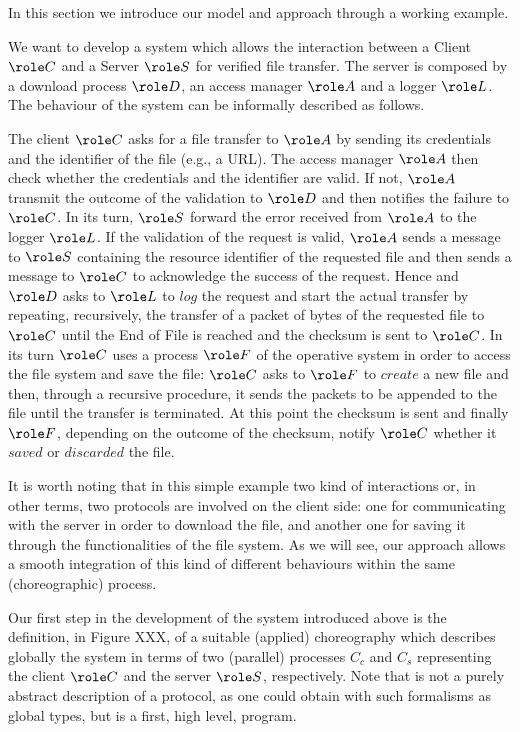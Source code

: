 

In this section we introduce our model and approach through a working example. 



We want to develop a system which allows the interaction between  a Client
$\role C$ and a Server $\role S$ for verified file transfer. The server is
composed by a download process $\role D$, an access manager  $\role A$ and a
logger $\role L$. The behaviour of the system can be informally described as
follows.

The client $\role C$ asks for a file transfer to $\role A$ by sending its
credentials and the identifier of the file (e.g., a URL). The access manager
$\role A$ then check whether the credentials and the  identifier are valid. If
not, $\role A$ transmit the outcome of the validation to $\role D$ and then
notifies the failure  to $\role C$. In its turn,  $\role S$ forward the error
received from $\role A$ to the logger $\role L$.
If the validation of the request is valid, $\role A$ sends a message to $\role
S$ containing the resource identifier of the requested file and then sends a
message to $\role C$  to acknowledge the success of the request. Hence  and
$\role D$ asks to $\role L$ to $log$ the request and start the actual transfer
by repeating, recursively, the transfer of  a packet of bytes of the requested
file to $\role C$ until the End of File is reached and  the checksum is sent to
$\role C$. In its turn $\role C$ uses a process  $\role F$ of the operative
system in order to access the file system and save the file: $\role C$ asks to
$\role F$ to $create$ a new file and then, through a recursive procedure, it
sends the packets to be appended to the file until the transfer is terminated.
At this point  the checksum is sent and finally  $\role F$, depending on the
outcome of the checksum,  notify  $\role C$ whether it $saved$ or $discarded$
the file.


It is worth noting that in this simple example two kind of interactions or, in
other terms, two protocols are involved on the client side: one for
communicating with the server in order to download the file, and another one
for saving it through the functionalities of the file system. As we will see,
our approach allows a smooth integration of this kind of different behaviours
within the same (choreographic) process.


Our first step in the development of the system introduced above is the
definition, in Figure XXX, of a suitable (applied) choreography which describes
globally the system in terms of two  (parallel) processes $C_c$ and $C_s$
representing  the client $\role C$  and the server $\role S$, respectively.
Note that is not a purely abstract description of a protocol, as one could
obtain with such formalisms as global types, but is a first, high level,
program.

